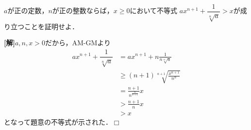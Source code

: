\documentclass[a4j]{jarticle}
\begin{document}

     \begin{oframed}
     $a$が正の定数，$n$が正の整数ならば，$x\ge0$において不等式
     $ax^{n+1}+\dfrac{1}{\sqrt[n]{a}}>x$が成り立つことを証明せよ．
     \end{oframed}

\setlength{\columnseprule}{0.4pt}
\begin{multicols}{2}
{\bf[解]}$a,n,x>0$だから，AM-GMより
     \begin{align*}
     ax^{n+1}+\dfrac{1}{\sqrt[n]{a}}&=ax^{n+1}+n\frac{1}{n\sqrt[n]{a}}  \\
     &\ge (n+1)\sqrt[n+1]{\frac{x^{n+1}}{n^n}}  \\
     &=\frac{n+1}{n^{\frac{n}{n+1}}}x  \\
     &>\frac{n+1}{n}x  \\
     &>x
     \end{align*}
となって題意の不等式が示された．$\Box$
\newpage
\end{multicols}
\end{document}
